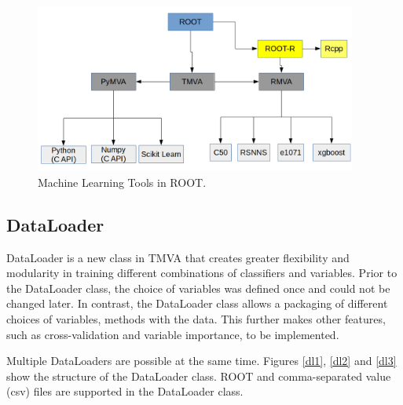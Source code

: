 \documentclass[a4paper]{jpconf}
\begin{document}
\begin{figure}[h]
\centering
\includegraphics[width=25pc]{img/tmva.png}\caption{\label{tmva:label} Machine Learning Tools in ROOT.}
\end{figure}

\subsection{DataLoader}
DataLoader is a new class in TMVA that creates greater flexibility and modularity in training different combinations of classifiers and variables\cite{Hocker:2007ht}. Prior to the DataLoader class, the choice of variables was defined once and could not be changed later. In contrast, the DataLoader class allows a packaging of different choices of variables, methods with the data. This further makes other features, such as cross-validation and variable importance, to be implemented.

Multiple DataLoaders are possible at the same time. Figures \ref{dl1}, \ref{dl2} and \ref{dl3} show the structure of the DataLoader class. ROOT and comma-separated value (csv) files are supported in the DataLoader class.
\end{document}
